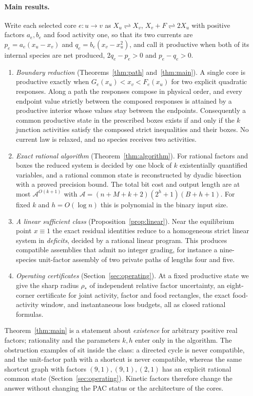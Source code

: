 \documentclass[11pt,a4paper]{article}
\theoremstyle{plain}
\theoremstyle{definition}
\theoremstyle{remark}
\newcommand{\rev}{\rightleftharpoons}
\newcommand{\Abound}{\mathcal{A}}
\begin{document}
\paragraph{Main results.} Write each selected core $e\colon u\to v$ as $X_u\rev X_v$, $X_v+F\rev 2X_u$ with positive factors $a_e,b_e$ and food activity one, so that its two currents are $p_e=a_e(x_u-x_v)$ and $q_e=b_e(x_v-x_u^2)$, and call it productive when both of its internal species are net produced, $2q_e-p_e>0$ and $p_e-q_e>0$.
\begin{enumerate}[label=(\Alph*)]
\item \emph{Boundary reduction} (Theorems~\ref{thm:path} and~\ref{thm:main}). A single core is productive exactly when $G_e(x_u)<x_v<F_e(x_u)$ for two explicit quadratic responses. Along a path the responses compose in physical order, and every endpoint value strictly between the composed responses is attained by a productive interior whose values stay between the endpoints. Consequently a common productive state in the prescribed boxes exists if and only if the $k$ junction activities satisfy the composed strict inequalities and their boxes. No current law is relaxed, and no species receives two activities.
\item \emph{Exact rational algorithm} (Theorem~\ref{thm:algorithm}). For rational factors and boxes the reduced system is decided by one block of $k$ existentially quantified variables, and a rational common state is reconstructed by dyadic bisection with a proved precision bound. The total bit cost and output length are at most $\Abound^{O(k+1)}$ with $\Abound=(n+M+k+2)(2^h+1)(B+h+1)$. For fixed $k$ and $h=O(\log n)$ this is polynomial in the binary input size.
\item \emph{A linear sufficient class} (Proposition~\ref{prop:linear}). Near the equilibrium point $x\equiv1$ the exact residual identities reduce to a homogeneous strict linear system in \emph{deficits}, decided by a rational linear program. This produces compatible assemblies that admit no integer grading, for instance a nine-species unit-factor assembly of two private paths of lengths four and five.
\item \emph{Operating certificates} (Section~\ref{sec:operating}). At a fixed productive state we give the sharp radius $\rho_*$ of independent relative factor uncertainty, an eight-corner certificate for joint activity, factor and food rectangles, the exact food-activity window, and instantaneous loss budgets, all as closed rational formulas.
\end{enumerate}
Theorem~\ref{thm:main} is a statement about \emph{existence} for arbitrary positive real factors; rationality and the parameters $k,h$ enter only in the algorithm. The obstruction examples of \citep{tcch2026} sit inside the class: a directed cycle is never compatible, and the unit-factor path with a shortcut is never compatible, whereas the same shortcut graph with factors $(9,1),(9,1),(2,1)$ has an explicit rational common state (Section~\ref{sec:operating}). Kinetic factors therefore change the answer without changing the PAC status or the architecture of the cores.
\end{document}

